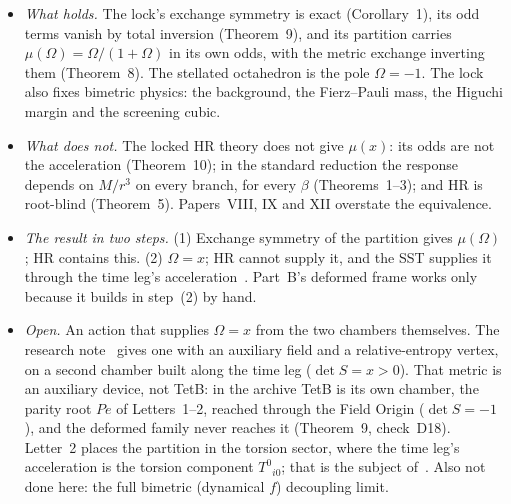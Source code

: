 \documentclass[twocolumn]{iopjournal}
\begin{document}
\begin{itemize}
\item \emph{What holds.} The lock's exchange symmetry is exact
(Corollary~1), its odd terms vanish by total inversion (Theorem~9), and
its partition carries $\mu(\Omega) = \Omega/(1+\Omega)$ in its own odds,
with the metric exchange inverting them (Theorem~8). The stellated
octahedron is the pole $\Omega = -1$. The lock also fixes bimetric
physics: the background, the Fierz--Pauli mass, the Higuchi margin and
the screening cubic.
\item \emph{What does not.} The locked HR theory does not give
$\mu(x)$: its odds are not the acceleration (Theorem~10); in the
standard reduction the response depends on $M/r^3$ on every branch, for
every $\beta$ (Theorems~1--3); and HR is root-blind (Theorem~5).
Papers~VIII, IX and XII overstate the equivalence.
\item \emph{The result in two steps.} (1) Exchange symmetry of the
partition gives $\mu(\Omega)$; HR contains this. (2) $\Omega = x$; HR
cannot supply it, and the SST supplies it through the time leg's
acceleration~\cite{NelsonTL}. Part~B's deformed frame works only
because it builds in step~(2) by hand.
\item \emph{Open.} An action that supplies $\Omega = x$ from the two
chambers themselves. The research note~\cite{NelsonTwoConn} gives one
with an auxiliary field and a relative-entropy vertex, on a second
chamber built along the time leg ($\det S = x > 0$). That metric is an
auxiliary device, not TetB: in the archive TetB is its own chamber, the
parity root $Pe$ of Letters~1--2, reached through the Field Origin
($\det S = -1$), and the deformed family never reaches it (Theorem~9,
check~D18). Letter~2 places the partition in the torsion
sector, where the time leg's acceleration is the torsion component
$T^0{}_{i0}$; that is the subject of~\cite{NelsonTwoConn}. Also not done
here: the full bimetric (dynamical $f$) decoupling limit.
\end{itemize}
\end{document}
